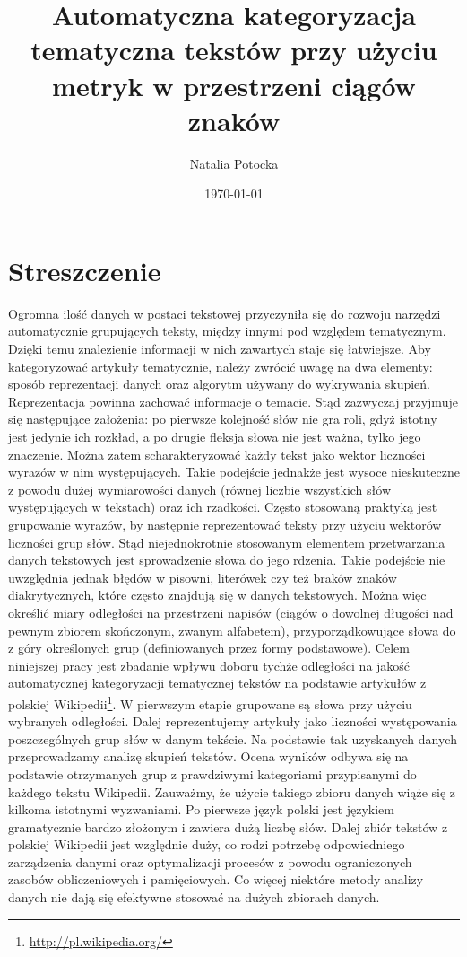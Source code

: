 \documentclass{praca1}
\author{Natalia Potocka}
\title{Automatyczna kategoryzacja tematyczna tekstów przy użyciu metryk w przestrzeni ciągów znaków}
\date{\today}
\begin{document}
\maketitle


\section*{Streszczenie}

Ogromna ilość danych w postaci tekstowej przyczyniła się do rozwoju narzędzi automatycznie grupujących teksty, między innymi pod względem tematycznym. Dzięki temu znalezienie informacji w nich zawartych staje się łatwiejsze. Aby kategoryzować artykuły tematycznie, należy zwrócić uwagę na dwa elementy: sposób reprezentacji danych oraz algorytm używany do wykrywania skupień. Reprezentacja powinna zachować informacje o temacie. Stąd zazwyczaj przyjmuje się następujące założenia: po pierwsze kolejność słów nie gra roli, gdyż istotny jest jedynie ich rozkład, a po drugie fleksja słowa nie jest ważna, tylko jego znaczenie. Można zatem scharakteryzować każdy tekst jako wektor liczności wyrazów w nim występujących. Takie podejście jednakże jest wysoce nieskuteczne z powodu dużej wymiarowości danych (równej liczbie wszystkich słów występujących w tekstach) oraz ich rzadkości. Często stosowaną praktyką jest grupowanie wyrazów, by następnie reprezentować teksty przy użyciu wektorów liczności grup słów. Stąd niejednokrotnie stosowanym elementem przetwarzania danych tekstowych jest sprowadzenie słowa do jego rdzenia. Takie podejście nie uwzględnia jednak błędów w pisowni, literówek czy też braków znaków diakrytycznych, które często znajdują się w danych tekstowych. Można więc określić miary odległości na przestrzeni napisów (ciągów o dowolnej długości nad pewnym zbiorem skończonym, zwanym alfabetem), przyporządkowujące słowa do z góry określonych grup (definiowanych przez formy podstawowe). Celem niniejszej pracy jest zbadanie wpływu doboru tychże odległości na jakość automatycznej kategoryzacji tematycznej tekstów na podstawie artykułów z polskiej Wikipedii\footnote{\url{http://pl.wikipedia.org/}}. W pierwszym etapie grupowane są słowa przy użyciu wybranych odległości. Dalej reprezentujemy artykuły jako liczności występowania poszczególnych grup słów w danym tekście. Na podstawie tak uzyskanych danych przeprowadzamy analizę skupień tekstów. Ocena wyników odbywa się na podstawie otrzymanych grup z prawdziwymi kategoriami przypisanymi do każdego tekstu Wikipedii. Zauważmy, że użycie takiego zbioru danych wiąże się z kilkoma istotnymi wyzwaniami. Po pierwsze język polski jest językiem gramatycznie bardzo złożonym i zawiera dużą liczbę słów. Dalej zbiór tekstów z polskiej Wikipedii jest względnie duży, co rodzi potrzebę odpowiedniego zarządzenia danymi oraz optymalizacji procesów z powodu ograniczonych zasobów obliczeniowych i pamięciowych. Co więcej niektóre metody analizy danych nie dają się efektywne stosować na dużych zbiorach danych.
\end{document}
